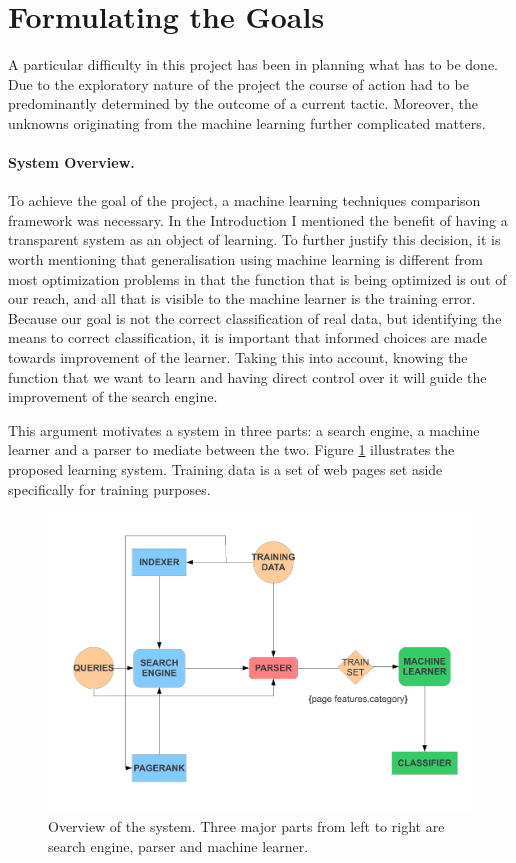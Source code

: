 \documentclass[12pt,twoside,notitlepage]{report}
\begin{document}
\section{Formulating the Goals}
\label{prep}
A particular difficulty in this project has been in planning what has to be
done. Due to the exploratory nature of the project the course of action had to
be predominantly determined by the outcome of a current tactic. Moreover, the
unknowns originating from the machine learning further complicated matters. 

\paragraph{System Overview.}

To achieve the goal of the project, a machine learning techniques comparison
framework was necessary. In the Introduction I mentioned the benefit of having
a transparent system as an object of learning. To further justify this
decision, it is worth mentioning that  generalisation using machine learning is
different from most optimization problems in that the function that is being
optimized is out of our reach, and all that is visible to the machine learner
is the training error. Because our goal is not the correct classification of
real data, but identifying the means to correct classification, it is important
that informed choices are made towards improvement of the learner. Taking this
into account, knowing the function that we want to learn and having direct
control over it  will guide the improvement of the search engine. 

This argument motivates a system in three parts: a search engine, a machine
learner and a parser to mediate between the two.  Figure \ref{overview}
illustrates the proposed learning system. Training data is a set of web pages
set aside specifically for training purposes.  

\begin{figure}
\centering
\includegraphics[scale=0.5]{figs/overview.pdf}
\caption{Overview of the system. Three major parts from left to right are search engine,
parser and machine learner.}
\label{overview}
\end{figure}
\end{document}
